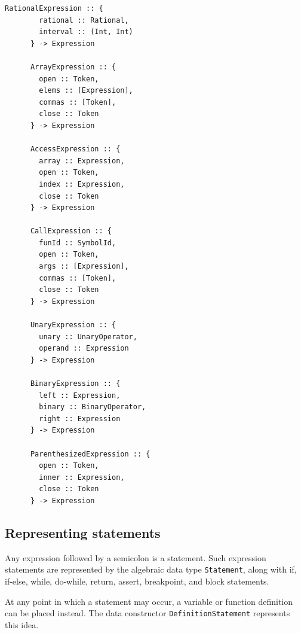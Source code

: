 \documentclass[UdineBachThesis,american,11pt]{PhdThesis}
\begin{document}
  \begin{Verbatim}[gobble=4,fontsize=\small]
      RationalExpression :: {
        rational :: Rational,
        interval :: (Int, Int)
      } -> Expression

      ArrayExpression :: {
        open :: Token,
        elems :: [Expression],
        commas :: [Token],
        close :: Token
      } -> Expression

      AccessExpression :: {
        array :: Expression,
        open :: Token,
        index :: Expression,
        close :: Token
      } -> Expression

      CallExpression :: {
        funId :: SymbolId,
        open :: Token,
        args :: [Expression],
        commas :: [Token],
        close :: Token
      } -> Expression

      UnaryExpression :: {
        unary :: UnaryOperator,
        operand :: Expression
      } -> Expression

      BinaryExpression :: {
        left :: Expression,
        binary :: BinaryOperator,
        right :: Expression
      } -> Expression

      ParenthesizedExpression :: {
        open :: Token,
        inner :: Expression,
        close :: Token
      } -> Expression
  \end{Verbatim}

  \subsection{Representing statements}

  Any expression followed by a semicolon is a statement. Such expression
  statements are represented by the algebraic data type
  \mbox{\texttt{Statement}}, along with if, if-else, while, do-while, return,
  assert, breakpoint, and block statements.

  \pagebreak

  At any point in which a statement may occur, a variable or function definition
  can be placed instead. The data constructor
  \mbox{\texttt{DefinitionStatement}} represents this idea.
\end{document}
